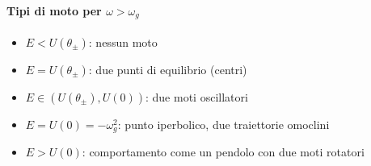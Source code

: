 \begin{example}
    \paragraph{Tipi di moto per $\omega > \omega_g$}
    \begin{itemize}
        \item $E < U(\theta_\pm)$: nessun moto
        \item $E = U(\theta_\pm)$: due punti di equilibrio (centri)
        \item $E \in \left( U(\theta_\pm), U(0) \right)$: due moti oscillatori
        \item $E = U(0) = -\omega_g^2$: punto iperbolico, due traiettorie omoclini
        \item $E > U(0)$: comportamento come un pendolo con due moti rotatori
    \end{itemize}


\end{example}


